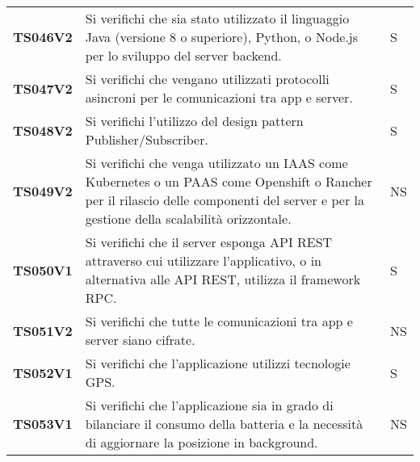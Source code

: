 \documentclass[../piano-di-qualifica.tex]{subfiles}
\begin{document}
\begin{longtable}[H]{>{\centering\bfseries}m{3cm} >{}m{10cm} >{\centering\arraybackslash}m{3cm}}
  TS046V2            & Si verifichi che sia stato utilizzato il linguaggio Java (versione 8 o superiore), Python, o Node.js per lo sviluppo del server backend.
                     & S               \\

  TS047V2            & Si verifichi che vengano utilizzati protocolli asincroni per le comunicazioni tra app e server.
                     & S                                                                                                                                                                                                                                                               \\

  TS048V2            & Si verifichi l'utilizzo del design pattern Publisher/Subscriber.
                     & S                                                                                                                                                                                                                                                               \\

  TS049V2            & Si verifichi che venga utilizzato un IAAS come Kubernetes o un PAAS come Openshift o Rancher per il rilascio delle componenti del server e per la gestione della scalabilità orizzontale.
                     & NS           
                                                                                                                                                                                                                                                                  \\
  TS050V1            & Si verifichi che il server esponga API REST attraverso cui utilizzare l'applicativo, o in alternativa alle API REST, utilizza il framework RPC\@.
                     & S\\

  TS051V2            & Si verifichi che tutte le comunicazioni tra app e server siano cifrate.
                     & NS\\

  TS052V1            & Si verifichi che l'applicazione utilizzi tecnologie GPS\@.
                     & S \\

  TS053V1            & Si verifichi che l'applicazione sia in grado di bilanciare il consumo della batteria e la necessità di aggiornare la posizione in background.
                     & NS                                                                                                                                                                                                                                                               \\


\end{longtable}
\end{document}
